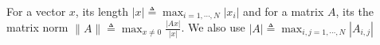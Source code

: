 \documentclass[a4paper,11pt]{article}
\newcommand{\upl}{\overline{\lambda}}
\newtheorem{lemma}{Lemma}[section]
\theoremstyle{remark}
\begin{document}
For a vector $x$, its length $\displaystyle|x|\triangleq \max_{i=1,\cdots,N} |x_i|$ and for a matrix $A$, its the matrix norm $\displaystyle \|A\|\triangleq \max_{x\ne0} \frac{|Ax|}{|x|}$. We also use $\displaystyle |A| \triangleq \max_{i,j=1,\cdots,N} |A_{i,j}|$
% 
%  
\end{document}
